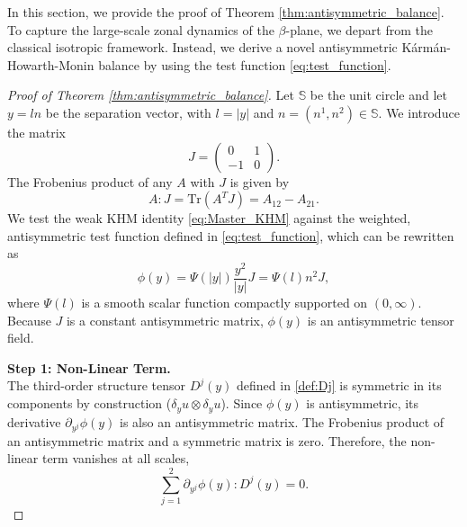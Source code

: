 \documentclass[11pt,a4paper]{article}
\numberwithin{equation}{section}
\numberwithin{theorem}{section}
\numberwithin{remark}{section}
\numberwithin{definition}{section}
\begin{document}
In this section, we provide the proof of Theorem \ref{thm:antisymmetric_balance}. To capture the large-scale zonal dynamics of the $\beta$-plane, we depart from the classical isotropic framework. Instead, we derive a novel antisymmetric Kármán-Howarth-Monin balance by using the test function \eqref{eq:test_function}.


\begin{proof}[Proof of Theorem \ref{thm:antisymmetric_balance}]
Let $\mathbb{S}$ be the unit circle and let $y = l n$ be the separation vector, with $l = |y|$ and $n = (n^1, n^2) \in \mathbb{S}$. We introduce the matrix 
\begin{equation*}
    J = \left(\begin{matrix} 0 & 1 \\ -1 & 0 \end{matrix}\right).
\end{equation*}
The Frobenius product of any $A$ with $J$ is given by
\begin{equation}\label{eq:frobenius}
    A : J = \text{Tr}(A^T J) = A_{12} - A_{21}.
\end{equation}
We test the weak KHM identity \eqref{eq:Master_KHM} against the weighted, antisymmetric test function defined in \eqref{eq:test_function}, which can be rewritten as
\begin{equation}
    \phi(y) = \Psi(|y|) \frac{y^2}{|y|} J = \Psi(l) n^2 J,
\end{equation}
where $\Psi(l)$ is a smooth scalar function compactly supported on $(0, \infty)$. Because $J$ is a constant antisymmetric matrix, $\phi(y)$ is an antisymmetric tensor field.


\text{}

\noindent \textbf{Step 1: Non-Linear Term.}\\
The third-order structure tensor $D^j(y)$ defined in \eqref{def:Dj} is symmetric in its components by construction ($\delta_y u \otimes \delta_y u$). Since $\phi(y)$ is antisymmetric, its derivative $\partial_{y^j}\phi(y)$ is also an antisymmetric matrix. The Frobenius product of an antisymmetric matrix and a symmetric matrix is zero. Therefore, the non-linear term vanishes at all scales,
\begin{equation}\label{eq:anti_inertial}
    \sum_{j=1}^2 \partial_{y^j}\phi(y) : D^j(y) = 0.
\end{equation}


\end{proof}
\end{document}
